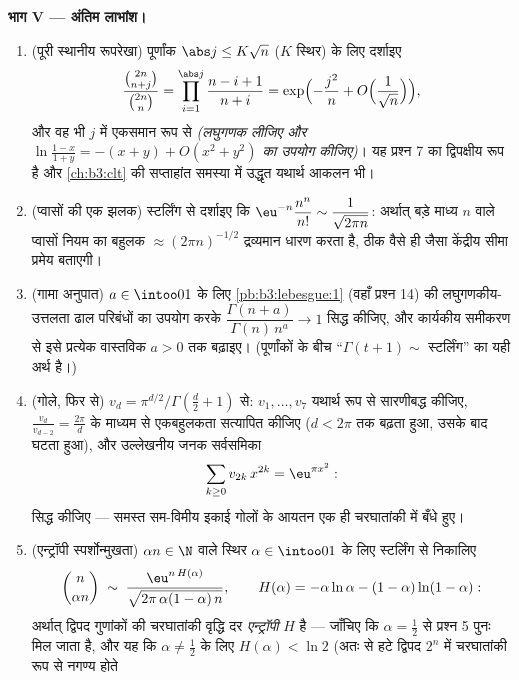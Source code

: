 \begin{problem}
\medskip
\noindent\textbf{भाग V --- अंतिम लाभांश।}
\begin{enumerate}[resume]
  \item (पूरी स्थानीय रूपरेखा) पूर्णांक $\abs j \leq
        K\sqrt n$ ($K$ स्थिर) के
        लिए दर्शाइए
        \[
        \frac{\binom{2n}{n+j}}{\binom{2n}{n}} =
        \prod_{i=1}^{\abs j}\frac{n - i + 1}{n + i}
        = \exp\Bigl(-\frac{j^2}n +
        O\Bigl(\frac1{\sqrt n}\Bigr)\Bigr),
        \]
        और वह भी $j$ में एकसमान रूप से \emph{(लघुगणक लीजिए और
        $\ln
        \frac{1-x}{1+y} = -(x + y) + O(x^2 + y^2)$ का उपयोग कीजिए)}। यह प्रश्न 7 का द्विपक्षीय रूप है
        और \cref{ch:b3:clt} की सप्ताहांत समस्या में उद्धृत यथार्थ आकलन भी।
  \item (प्वासों की एक झलक) स्टर्लिंग से दर्शाइए कि $\eu^{-n}\dfrac{n^n}{n!} \sim \dfrac1{\sqrt{2\pi n}}$:
        अर्थात् बड़े माध्य $n$ वाले प्वासों नियम का बहुलक $\approx (2\pi n)^{-1/2}$
        द्रव्यमान धारण करता है, ठीक वैसे ही जैसा केंद्रीय सीमा
        प्रमेय बताएगी।
  \item (गामा अनुपात) $a \in \intoo01$ के लिए \cref{pb:b3:lebesgue:1} (वहाँ प्रश्न 14) की
        लघुगणकीय-उत्तलता ढाल परिबंधों का उपयोग करके $\dfrac{\Gamma(n + a)}{\Gamma(n)\,n^a} \to 1$ सिद्ध
        कीजिए, और कार्यकीय समीकरण से इसे प्रत्येक वास्तविक $a > 0$
        तक बढ़ाइए। (पूर्णांकों के बीच ``$\Gamma(t+1) \sim$ स्टर्लिंग'' का यही
        अर्थ है।)
  \item (गोले, फिर से) $v_d = \pi^{d/2}/\Gamma(\frac d2
        + 1)$ से: $v_1, \dots, v_7$ यथार्थ रूप से सारणीबद्ध
        कीजिए, $\frac{v_d}{v_{d-2}} = \frac{2\pi}d$ के माध्यम से एकबहुलकता सत्यापित कीजिए ($d < 2\pi$
        तक बढ़ता हुआ, उसके बाद घटता हुआ), और उल्लेखनीय जनक
        सर्वसमिका
        \[
        \sum_{k\geq0}v_{2k}\,x^{2k} = \eu^{\pi x^2} :
        \]
        सिद्ध कीजिए --- समस्त सम-विमीय इकाई गोलों के आयतन एक ही
        चरघातांकी में बँधे हुए।
  \item (एन्ट्रॉपी स्पर्शोन्मुखता) $\alpha n \in \N$ वाले स्थिर $\alpha \in \intoo01$ के लिए
        स्टर्लिंग से निकालिए
        \[
        \binom{n}{\alpha n} \;\sim\;
        \frac{\eu^{n\,H(\alpha)}}
        {\sqrt{2\pi\,\alpha(1-\alpha)\,n}},
        \qquad
        H(\alpha) = -\alpha\ln\alpha -
        (1-\alpha)\ln(1-\alpha) :
        \]
        अर्थात् द्विपद गुणांकों की चरघातांकी वृद्धि दर
        \emph{एन्ट्रॉपी} $H$ है --- जाँचिए कि $\alpha =
        \frac12$ से प्रश्न
        5 पुनः मिल जाता है, और यह कि $\alpha \neq \frac12$ के लिए $H(\alpha) <
        \ln2$ (अतः
         से हटे द्विपद $2^n$ में चरघातांकी रूप से नगण्य होते

\end{enumerate}
\end{problem}
